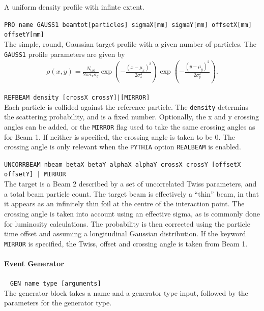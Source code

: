 A uniform density profile with infinte extent.

\bigskip
\noindent\texttt{PRO name GAUSS1 beamtot[particles] sigmaX[mm] sigmaY[mm] offsetX[mm] offsetY[mm]} \\

The simple, round, Gaussian target profile with a given number of particles.
The \texttt{GAUSS1} profile parameters are given by
\begin{align}
    \rho(x,y) = \frac{N_{\mathrm{tot}}}{2\pi\sigma_x\sigma_y}
                \exp\left(-\frac{(x-\mu_x)^2}{2\sigma_x^2}\right)
                \exp\left(-\frac{(y-\mu_y)^2}{2\sigma_y^2}\right).
\end{align}

\bigskip
\noindent\texttt{REFBEAM density [crossX crossY]|[MIRROR]}\\

Each particle is collided against the reference particle.
The \texttt{density} determins the scattering probability, and is a fixed number.
Optionally, the x and y crossing angles can be added, or the \texttt{MIRROR} flag used to take the same crossing angles as for Beam 1.
If neither is specified, the crossing angle is taken to be 0.
The crossing angle is only relevant when the \texttt{PYTHIA} option \texttt{REALBEAM} is enabled.

\bigskip
\noindent\texttt{UNCORRBEAM nbeam betaX betaY alphaX alphaY crossX crossY [offsetX offsetY] | MIRROR}\\

The target is a Beam 2 described by a set of uncorrelated Twiss parameters, and a total beam particle count.
The target beam is effectively a ``thin'' beam, in that it appears as an infinitely thin foil at the centre of the interaction point.
The crossing angle is taken into account using an effective sigma, as is commonly done for luminosity calculations.
The probability is then corrected using the particle time offset and assuming a longitudinal Gaussian distribution.
If the keyword \texttt{MIRROR} is specified, the Twiss, offset and crossing angle is taken from Beam 1.

\paragraph{Event Generator}~ \texttt{GEN name type [arguments]} \\

The generator block takes a name and a generator type input, followed by the parameters for the
generator type.

